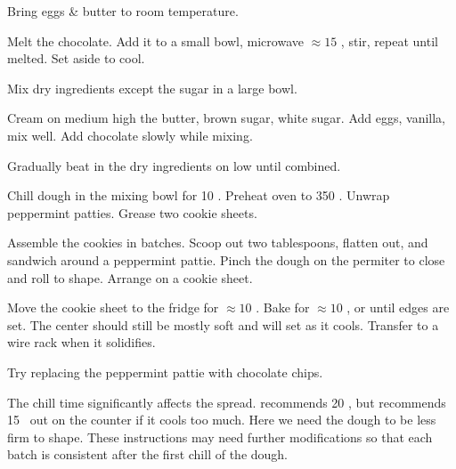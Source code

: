\begin{preparation}
\item Bring eggs \& butter to room temperature.

\item Melt the chocolate.
	Add it to a small bowl, microwave $\approx 15$ \second, stir, repeat until melted.
	Set aside to cool.

\item Mix dry ingredients except the sugar in a large bowl.

\item Cream on medium high the butter, brown sugar, white sugar.
	Add eggs, vanilla, mix well.
	Add chocolate slowly while mixing.

\item Gradually beat in the dry ingredients on low until combined.

\item Chill dough in the mixing bowl for 10 \minute.
	Preheat oven to 350 \Fahrenheit.
	Unwrap peppermint patties.
	Grease two cookie sheets.

\item Assemble the cookies in batches.
	Scoop out two tablespoons, flatten out, and sandwich around a peppermint pattie.
	Pinch the dough on the permiter to close and roll to shape.
	Arrange on a cookie sheet.

\item Move the cookie sheet to the fridge for $\approx 10$ \minute.
	Bake for $\approx 10$ \minute, or until edges are set.
	The center should still be mostly soft and will set as it cools.
	Transfer to a wire rack when it solidifies.
\end{preparation}

\begin{variation}
\item Try replacing the peppermint pattie with chocolate chips.
\end{variation}


\begin{experiments}
\item The chill time significantly affects the spread.
	\citeauthor{sallyBrownies2020}\cite{sallyBrownies2020} recommends 20 \minute, but recommends 15 \minute~out on the counter if it cools too much.
	Here we need the dough to be less firm to shape.
	These instructions may need further modifications so that each batch is consistent after the first chill of the dough.
\end{experiments}


\recipeend
